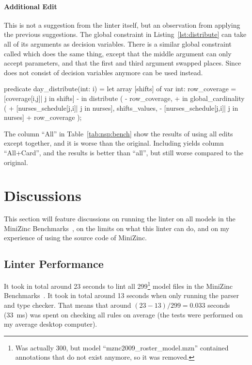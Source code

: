 \documentclass[a4paper,12pt]{article}
\begin{document}
\paragraph{Additional Edit}
\begin{sloppypar}
This is not a suggestion from the linter itself, but an
observation from applying the previous suggestions.
The global constraint  in Listing~\ref{lst:distribute} can take all of its
arguments as decision variables. There is a similar global constraint called
 which does the same thing, except that the middle argument can
only accept parameters, and that the first and third argument swapped places. Since
 does not consist of decision variables anymore can
 be used instead.
\end{sloppypar}
\begin{mznnobreak}[style=diff]
predicate day_distribute(int: i) = let {
  array [shifts] of var int: row_coverage =
    [coverage[i,j]| j in shifts]
  }
- in distribute (
-   row_coverage,
+ in global_cardinality (
+   [nurses_schedule[j,i]| j in nurses],
    shifts_values,
-   [nurses_schedule[j,i]| j in nurses]
+   row_coverage
    );
\end{mznnobreak}
\begin{sloppypar}
The column ``All'' in Table~\ref{tab:nsp:bench} show the results of using all edits except
 together, and it is worse than the original. Including
 yields column ``All+Card'', and the results is better than
``all'', but still worse compared to the original.
\end{sloppypar}

\section{Discussions}\label{sec:discussion}
This section will feature discussions on running the linter on all models in the MiniZinc
Benchmarks~\cite{mznbench}, on the limits on what this linter can do, and on my experience
of using the source code of MiniZinc.

\subsection{Linter Performance}
It took in total around 23 seconds to lint all 299\footnote{Was actually 300, but model
  ``mznc2009\_roster\_model.mzn'' contained annotations that do not exist anymore, so it was
  removed.} model
files in the MiniZinc Benchmarks~\cite{mznbench}. It took in total around 13 seconds when
only running the parser and type checker. That means that around $(23-13)/299 = 0.033$
seconds (\SI{33}{\milli\second}) was spent on checking all rules on average (the tests
were performed on my average desktop computer).
\end{document}
